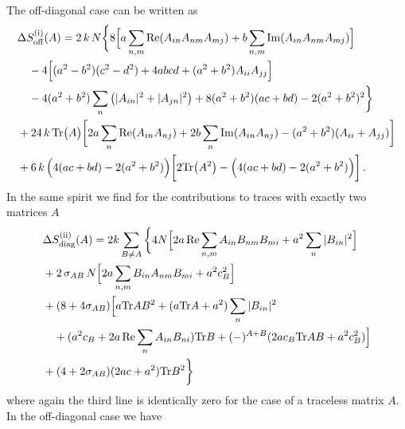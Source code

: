\documentclass[10pt,a4paper]{article}
\newcommand{\RN}[1]{%
    \textup{\uppercase\expandafter{\romannumeral#1}}%
}
\newcommand{\Tr}{\mathrm{Tr}\vspace{-2pt}}
\begin{document}
The off-diagonal case can be written as
\begin{align}
  &\Delta S^{(\RN{1})}_{\mathrm{off}} (A) = 2 \, k  \, N
  \bigg\{
    8
    \Big[
      a \sum_{n,m} \operatorname{Re} (A_{in} A_{nm} A_{mj}) +
      b \sum_{n,m} \operatorname{Im} (A_{in} A_{nm} A_{mj})
    \Big]
    \nonumber \\
    &\quad-4
    \Big[
      (a^2-b^2)(c^2-d^2)
      + 4 a b c d
      + ( a^2 + b^2 ) A_{ii} A_{jj}
    \Big]
    \nonumber \\
    &\quad-4 (a^2+b^2) \sum_n \left( |A_{in}|^2 + |A_{jn}|^2 \right)
    + 8 (a^2+b^2)(ac+bd)
    - 2 (a^2+b^2)^2
  \bigg\}
  \nonumber \\
  &+24 \, k  \, \Tr \big( A \big)
  \bigg[
    2 a \sum_n \operatorname{Re} (A_{in} A_{nj})
    + 2 b \sum_n \operatorname{Im} (A_{in} A_{nj})
    - (a^2+b^2) (A_{ii}+A_{jj})
  \bigg]
  \nonumber \\
  &+6 \, k \,
  \Big( 4 ( ac + bd ) - 2 ( a^2 + b^2 ) \Big)
  \bigg[
    2 \Tr \big( A^2 \big)
    -
    \Big( 4 ( ac + bd ) - 2 ( a^2 + b^2 ) \Big)
  \bigg] \,.
\end{align}
In the same spirit we find for the contributions to traces with exactly two matrices $A$
\begin{align}
  &\Delta S^{(\RN{2})}_{\mathrm{diag}} (A) =
  2k \sum_{B \neq A} \bigg\{ 4N \Big[
      2 a \operatorname{Re} \sum_{n,m} A_{in} B_{nm} B_{mi}
      + a^2 \sum_n |B_{in}|^2
  \Big]\\
  &+2 \, \sigma_{AB}\,N   \Big[
      2 a \sum_{n,m} B_{in} A_{nm} B_{mi}
      + a^2 c_B^2
  \Big]\\
  &+ (8+4\sigma_{AB}) \Big[
    a \Tr AB^2 + (a\Tr A +a^2) \sum_n |B_{in}|^2 \\
    &\quad+ (a^2 c_B + 2a \operatorname{Re} \sum_n A_{in} B_{ni} ) \Tr B
    + (-)^{A+B} (2 a c_B \Tr AB + a^2 c_B^2)
  \Big] \\
  &+ (4+2\sigma_{AB})(2ac+a^2) \Tr B^2
 \bigg\}
\end{align}
where again the third line is identically zero for the case of a
traceless matrix $A$. In the off-diagonal case we have
\end{document}
